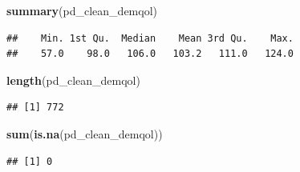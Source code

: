 \documentclass[
]{article}
\newenvironment{Shaded}{\begin{snugshade}}{\end{snugshade}}
\newcommand{\CommentTok}[1]{\textcolor[rgb]{0.56,0.35,0.01}{\textit{#1}}}
\newcommand{\FunctionTok}[1]{\textcolor[rgb]{0.13,0.29,0.53}{\textbf{#1}}}
\newcommand{\NormalTok}[1]{#1}
\newcommand{\OtherTok}[1]{\textcolor[rgb]{0.56,0.35,0.01}{#1}}
\newcommand{\SpecialCharTok}[1]{\textcolor[rgb]{0.81,0.36,0.00}{\textbf{#1}}}
\begin{document}
\begin{Shaded}
\end{Shaded}

\begin{Shaded}
\begin{Highlighting}[]
\FunctionTok{summary}\NormalTok{(pd\_clean\_demqol)}
\end{Highlighting}
\end{Shaded}

\begin{verbatim}
##    Min. 1st Qu.  Median    Mean 3rd Qu.    Max. 
##    57.0    98.0   106.0   103.2   111.0   124.0
\end{verbatim}

\begin{Shaded}
\begin{Highlighting}[]
\FunctionTok{length}\NormalTok{(pd\_clean\_demqol)}
\end{Highlighting}
\end{Shaded}

\begin{verbatim}
## [1] 772
\end{verbatim}

\begin{Shaded}
\begin{Highlighting}[]
\FunctionTok{sum}\NormalTok{(}\FunctionTok{is.na}\NormalTok{(pd\_clean\_demqol))}
\end{Highlighting}
\end{Shaded}

\begin{verbatim}
## [1] 0
\end{verbatim}
\end{document}
